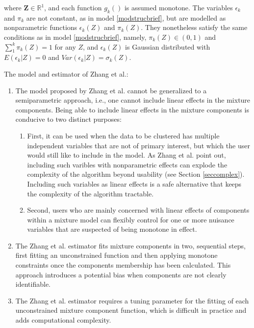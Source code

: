\documentclass[10pt]{olplainarticle}\usepackage[]{graphicx}\usepackage[]{color}
\begin{document}
where $\boldsymbol{Z} \in \mathbb{R}^1$, and each function $g_{k}()$ is assumed monotone. The variables $\epsilon_k$ and $\pi_k$ are not constant, as in model \ref{modstrucbrief}, but are modelled as nonparametric functions $\epsilon_k(Z)$ and $\pi_k(Z)$. They nonetheless satisfy the same conditions as in model \ref{modstrucbrief}, namely, $\pi_k(Z) \in (0,1)$ and $\sum_{1}^{k} \pi_k(Z) = 1$ for any $Z$, and $\epsilon_k(Z)$ is Gaussian distributed with $E(\epsilon_k | Z) = 0$ and $Var(\epsilon_k | Z) = \sigma_k(Z)$. 

The model and estimator of Zhang et al.:

\begin{enumerate}[noitemsep] 
  \item The model proposed by Zhang et al. cannot be generalized to a semiparametric approach, i.e., one cannot include linear effects in the mixture components. Being able to include linear effects in the mixture components is conducive to two distinct purposes: 
    \begin{enumerate}[noitemsep]
      \item First, it can be used when the data to be clustered has multiple independent variables that are not of primary interest, but which the user would still like to include in the model. As Zhang et al. point out, including such varibles with nonparametric effects can explode the complexity of the algorithm beyond usability (see Section \ref{seccomplex}). Including such variables as linear effects is a safe alternative that keeps the complexity of the algorithm tractable.
      \item Second, users who are mainly concerned with linear effects of components within a mixture model can flexibly control for one or more nuisance variables that are suspected of being monotone in effect.
    \end{enumerate}
  \item The Zhang et al. estimator fits mixture components in two, sequential steps, first fitting an unconstrained function and then applying monotone constraints once the components membership has been calculated. This approach introduces a potential bias when components are not clearly identifiable.
  \item The Zhang et al. estimator requires a tuning parameter for the fitting of each unconstrained mixture component function, which is difficult in practice and adds computational complexity.
\end{enumerate}
\end{document}
